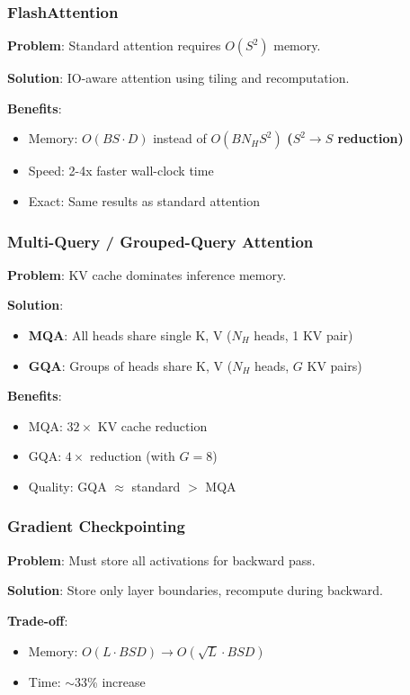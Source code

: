 \documentclass[10pt]{article}
\begin{document}
\subsubsection{FlashAttention}

\textbf{Problem}: Standard attention requires $O(S^2)$ memory.

\textbf{Solution}: IO-aware attention using tiling and recomputation.

\textbf{Benefits}:
\begin{itemize}
  \item Memory: $O(BS \cdot D)$ instead of $O(BN_H S^2)$ \textbf{($S^2 \rightarrow S$ reduction)}
  \item Speed: 2-4x faster wall-clock time
  \item Exact: Same results as standard attention
\end{itemize}

\subsubsection{Multi-Query / Grouped-Query Attention}

\textbf{Problem}: KV cache dominates inference memory.

\textbf{Solution}:
\begin{itemize}
  \item \textbf{MQA}: All heads share single K, V ($N_H$ heads, 1 KV pair)
  \item \textbf{GQA}: Groups of heads share K, V ($N_H$ heads, $G$ KV pairs)
\end{itemize}

\textbf{Benefits}:
\begin{itemize}
  \item MQA: $32\times$ KV cache reduction
  \item GQA: $4\times$ reduction (with $G=8$)
  \item Quality: GQA $\approx$ standard $>$ MQA
\end{itemize}

\subsubsection{Gradient Checkpointing}

\textbf{Problem}: Must store all activations for backward pass.

\textbf{Solution}: Store only layer boundaries, recompute during backward.

\textbf{Trade-off}:
\begin{itemize}
  \item Memory: $O(L \cdot BSD) \rightarrow O(\sqrt{L} \cdot BSD)$
  \item Time: $\sim$33\% increase
\end{itemize}
\end{document}
